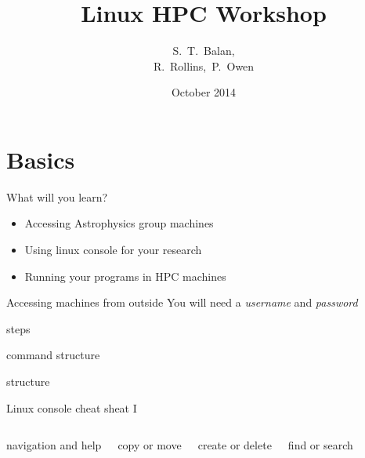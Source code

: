\documentclass{beamer}
\title[Linux HPC Workshop] %
{Linux HPC Workshop}
\author[Balan,Rollins,Owen] %
{S.~T.~Balan,\\[3mm]
R.~Rollins,~P.~Owen}
\institute[UCL]
{
  Department of Physics and Astronomy\\
  University College London
}
\date[Linux HPC 2014]
{October 2014}
\begin{document}
\frame{\titlepage}

\section{Basics}


\begin{frame}{What will you learn?}
  \begin{itemize}
    \item Accessing Astrophysics group machines
    \item Using linux console for your research
    \item Running your programs in HPC machines
  \end{itemize}
\end{frame}

\begin{frame}[fragile]{Accessing machines from outside}
  \alert{You will need a \emph{username} and \emph{password}}
  \begin{block}{steps}
    
  \end{block}
\end{frame}

\begin{frame}[fragile]{command structure}
  \begin{block}{structure}
    
  \end{block}
  \begin{example}
    
  \end{example}
\end{frame}


\begin{frame}[fragile]{Linux console cheat sheat I}
  \fontsize{7pt}{7}\selectfont
  \begin{columns}
    \begin{block}{navigation and help}
      
    \end{block}
    \begin{block}{copy or move}
      
    \end{block}

    \begin{block}{create or delete}
      
    \end{block}
    \begin{block}{find or search}
      
    \end{block}
  \end{columns}
\end{frame}
\end{document}
